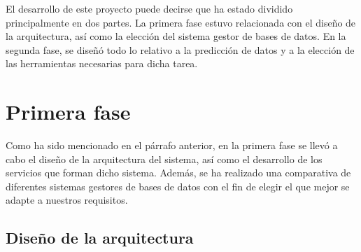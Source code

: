

El desarrollo de este proyecto puede decirse que ha estado dividido principalmente en dos partes. La primera
fase estuvo relacionada con el diseño de la arquitectura, así como la elección del sistema gestor de bases de
datos. En la segunda fase, se diseñó todo lo relativo a la predicción de datos y a la elección de las
herramientas necesarias para dicha tarea.

\section{Primera fase}

Como ha sido mencionado en el párrafo anterior, en la primera fase se llevó a cabo el diseño de la
arquitectura del sistema, así como el desarrollo de los servicios que forman dicho sistema. Además,
se ha realizado una comparativa de diferentes sistemas gestores de bases de datos con el fin de elegir
el que mejor se adapte a nuestros requisitos.

\subsection*{Diseño de la arquitectura}

